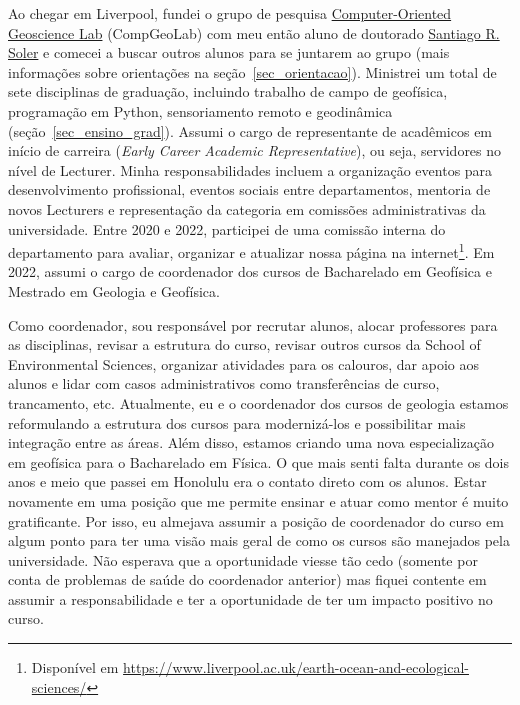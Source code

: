 \documentclass[10pt,a4paper,oneside]{book}
\newcommand{\SantiagoLink}{\href{https://www.santisoler.com/}{Santiago R. Soler}}
\begin{document}
Ao chegar em Liverpool, fundei o grupo de pesquisa
\href{https://www.compgeolab.org/}{Computer-Oriented Geoscience Lab} (CompGeoLab)
com meu então aluno de doutorado
\SantiagoLink{} e comecei a buscar outros
alunos para se juntarem ao grupo (mais informações sobre orientações na
seção~\ref{sec_orientacao}).
Ministrei um total de sete disciplinas de graduação, incluindo trabalho de
campo de geofísica, programação em Python, sensoriamento remoto e geodinâmica
(seção~\ref{sec_ensino_grad}).
Assumi o cargo de representante de acadêmicos em início de carreira
(\textit{Early Career Academic Representative}), ou seja, servidores no nível de
Lecturer.
Minha responsabilidades incluem a organização eventos para desenvolvimento
profissional, eventos sociais entre departamentos, mentoria de novos Lecturers
e representação da categoria em comissões administrativas da universidade.
Entre 2020 e 2022, participei de uma comissão interna do departamento para
avaliar, organizar e atualizar nossa página na internet\footnote{Disponível em
\url{https://www.liverpool.ac.uk/earth-ocean-and-ecological-sciences/}}.
Em 2022, assumi o cargo de coordenador dos cursos de Bacharelado em Geofísica
e Mestrado em Geologia e Geofísica.

Como coordenador, sou responsável por recrutar alunos, alocar professores para
as disciplinas, revisar a estrutura do curso, revisar outros cursos da School
of Environmental Sciences, organizar atividades para os calouros, dar apoio aos
alunos e lidar com casos administrativos como transferências de curso,
trancamento, etc.
Atualmente, eu e o coordenador dos cursos de geologia estamos reformulando a
estrutura dos cursos para modernizá-los e possibilitar mais integração entre as
áreas.
Além disso, estamos criando uma nova especialização em geofísica para o
Bacharelado em Física.
O que mais senti falta durante os dois anos e meio que passei em Honolulu era
o contato direto com os alunos.
Estar novamente em uma posição que me permite ensinar e atuar como mentor é
muito gratificante.
Por isso, eu almejava assumir a posição de coordenador do curso em algum ponto
para ter uma visão mais geral de como os cursos são manejados pela
universidade.
Não esperava que a oportunidade viesse tão cedo (somente por conta de problemas
de saúde do coordenador anterior) mas fiquei contente em assumir a
responsabilidade e ter a oportunidade de ter um impacto positivo no curso.
\end{document}
